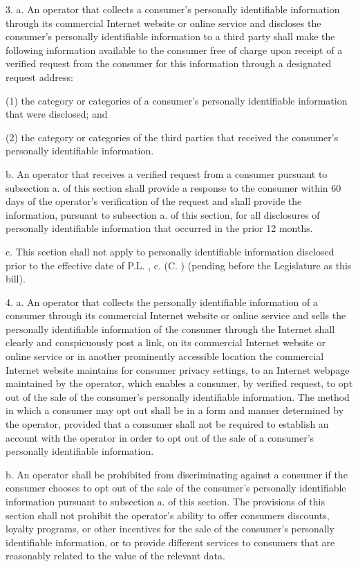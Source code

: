      3.    a.   An operator that collects a consumer's personally identifiable information through its commercial Internet website or online service and discloses the consumer's personally identifiable information to a third party shall make the following information available to the consumer free of charge upon receipt of a verified request from the consumer for this information through a designated request address:

     (1)   the category or categories of a consumer's personally identifiable information that were disclosed; and

     (2)   the category or categories of the third parties that received the consumer's personally identifiable information.

     b.    An operator that receives a verified request from a consumer pursuant to subsection a. of this section shall provide a response to the consumer within 60 days of the operator's verification of the request and shall provide the information, pursuant to subsection a. of this section, for all disclosures of personally identifiable information that occurred in the prior 12 months.

     c.     This section shall not apply to personally identifiable information disclosed prior to the effective date of P.L.    , c.    (C.      ) (pending before the Legislature as this bill).

 

     4.    a.   An operator that collects the personally identifiable information of a consumer through its commercial Internet website or online service and sells the personally identifiable information of the consumer through the Internet shall clearly and conspicuously post a link, on its commercial Internet website or online service or in another prominently accessible location the commercial Internet website maintains for consumer privacy settings, to an Internet webpage maintained by the operator, which enables a consumer, by verified request, to opt out of the sale of the consumer's personally identifiable information. The method in which a consumer may opt out shall be in a form and manner determined by the operator, provided that a consumer shall not be required to establish an account with the operator in order to opt out of the sale of a consumer's personally identifiable information.

     b.    An operator shall be prohibited from discriminating against a consumer if the consumer chooses to opt out of the sale of the consumer's personally identifiable information pursuant to subsection a. of this section. The provisions of this section shall not prohibit the operator's ability to offer consumers discounts, loyalty programs, or other incentives for the sale of the consumer's personally identifiable information, or to provide different services to consumers that are reasonably related to the value of the relevant data.

